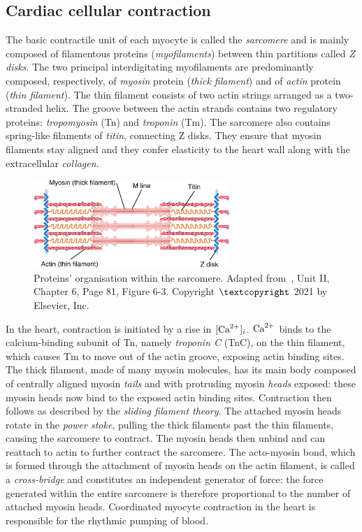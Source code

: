 %
%
%
\subsection{Cardiac cellular contraction}\label{sec:ch1cardiac_cellular_contraction}
The basic contractile unit of each myocyte is called the \textit{sarcomere} and is mainly composed of filamentous proteins (\textit{myofilaments}) between thin partitions called \textit{Z disks}. The two principal interdigitating myofilaments are predominantly composed, respectively, of \textit{myosin} protein (\textit{thick filament}) and of \textit{actin} protein (\textit{thin filament}). The thin filament consists of two actin strings arranged as a two-stranded helix. The groove between the actin strands contains two regulatory proteins: \textit{tropomyosin} (\acs{Tn}) and \textit{troponin} (\acs{Tm}). The sarcomere also contains spring-like filaments of \textit{titin}, connecting Z disks. They ensure that myosin filaments stay aligned and they confer elasticity to the heart wall along with the extracellular \textit{collagen}.

\begin{figure}[!ht]
    \myfloatalign
    \includegraphics[width=0.66\textwidth]{figures/chapter01/fig5.png}
    \caption{Proteins' organisation within the sarcomere. Adapted from~\cite{Guyton:2021}, Unit II, Chapter 6, Page 81, Figure 6-3. Copyright $\textcopyright$ 2021 by Elsevier, Inc.}
    \label{fig:my_label3}
\end{figure}

\vspace{0.2cm}
In the heart, contraction is initiated by a rise in $[\textrm{Ca}^{2+}]_{i}$. $\textrm{Ca}^{2+}$ binds to the calcium-binding subunit of Tn, namely \textit{troponin C} (\acs{TnC}), on the thin filament, which causes Tm to move out of the actin groove, exposing actin binding sites. The thick filament, made of many myosin molecules, has its main body composed of centrally aligned myosin \textit{tails} and with protruding myosin \textit{heads} exposed: these myosin heads now bind to the exposed actin binding sites. Contraction then follows as described by the \textit{sliding filament theory}. The attached myosin heads rotate in the \textit{power stoke}, pulling the thick filaments past the thin filaments, causing the sarcomere to contract. The myosin heads then unbind and can reattach to actin to further contract the sarcomere. The acto-myosin bond, which is formed through the attachment of myosin heads on the actin filament, is called a \textit{cross-bridge} and constitutes an independent generator of force: the force generated within the entire sarcomere is therefore proportional to the number of attached myosin heads. Coordinated myocyte contraction in the heart is responsible for the rhythmic pumping of blood.

